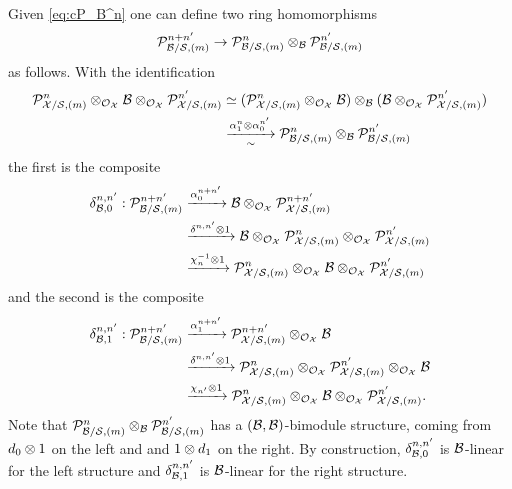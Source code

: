 \documentclass{article}
\theoremstyle{change}
\numberwithin{equation}{subsubsection}
\begin{document}
Given \ref{eq:cP_B^n} one can define two ring homomorphisms
\begin{displaymath}
  {\cal P}^{n+n'}_{{\cal B}/{\cal S},(m)}\to{\cal P}^n_{{\cal B}/{\cal S},(m)}\otimes_{\cal B}{\cal P}^{n'}_{{\cal B}/{\cal S},(m)}
\end{displaymath}
as follows. With the identification
\begin{align*}
  {\cal P}^n_{{\cal X}/{\cal S},(m)}\otimes_{{\cal O}_{\cal X}}{\cal B}
  \otimes_{{\cal O}_{\cal X}}{\cal P}^{n'}_{{\cal X}/{\cal S},(m)}
  &\simeq({\cal P}^n_{{\cal X}/{\cal S},(m)}\otimes_{{\cal O}_{\cal X}}{\cal B})\otimes_{\cal B}
    ({\cal B}\otimes_{{\cal O}_{\cal X}}{\cal P}^{n'}_{{\cal X}/{\cal S},(m)})\\
  &\underset{\sim}{\xrightarrow{\alpha^n_1\otimes\alpha^{n'}_0}}
  {\cal P}^n_{{\cal B}/{\cal S},(m)}\otimes_{\cal B}{\cal P}^{n'}_{{\cal B}/{\cal S},(m)}
\end{align*}
the first is the composite
\begin{equation}
  \label{eq:P_B-delta1}
  \begin{split}
    \delta^{n,n'}_{\cB,0}:\cP^{n+n'}_{\cB/\cS,(m)}
    &\Xto{\alpha^{n+n'}_0}\cB\tens_{\O_\cX}\cP^{n+n'}_{\cX/\cS,(m)}\\
    &\Xto{\delta^{n,n'}\tens1}\cB\tens_{\O_\cX}\cP^n_{\cX/\cS,(m)}
    \tens_{\O_\cX}\cP^{n'}_{\cX/\cS,(m)}\\
    &\Xto{\chi_n^{-1}\tens 1}\cP^n_{\cX/\cS,(m)}\tens_{\O_\cX}\cB
    \tens_{\O_\cX}\cP^{n'}_{\cX/\cS,(m)}%
  \end{split}
\end{equation}
and the second is the composite
\begin{equation}
  \label{eq:P_B-delta2}
  \begin{split}
    \delta^{n,n'}_{{\cal B},1}:{\cal P}^{n+n'}_{{\cal B}/{\cal S},(m)}
    &\xrightarrow{\alpha^{n+n'}_1}{\cal P}^{n+n'}_{{\cal X}/{\cal S},(m)}\otimes_{{\cal O}_{\cal X}}{\cal B}\\
    &\xrightarrow{\delta^{n,n'}\otimes1}{\cal P}^n_{{\cal X}/{\cal S},(m)}
    \otimes_{{\cal O}_{\cal X}}{\cal P}^{n'}_{{\cal X}/{\cal S},(m)}\otimes_{{\cal O}_{\cal X}}{\cal B}\\    
    &\xrightarrow{\chi_{n'}\otimes 1}{\cal P}^n_{{\cal X}/{\cal S},(m)}\otimes_{{\cal O}_{\cal X}}{\cal B}
    \otimes_{{\cal O}_{\cal X}}{\cal P}^{n'}_{{\cal X}/{\cal S},(m)}.
  \end{split}
\end{equation}
Note that ${\cal P}^n_{{\cal B}/{\cal S},(m)}\otimes_{\cal B}{\cal P}^{n'}_{{\cal B}/{\cal S},(m)}$
has a $({\cal B},{\cal B})$-bimodule structure, coming from $d_0\otimes1$ on the
left and and $1\otimes d_1$ on the right. By construction,
$\delta^{n,n'}_{{\cal B},0}$ is ${\cal B}$-linear for the left structure and
$\delta^{n,n'}_{{\cal B},1}$ is ${\cal B}$-linear for the right structure.
\end{document}
